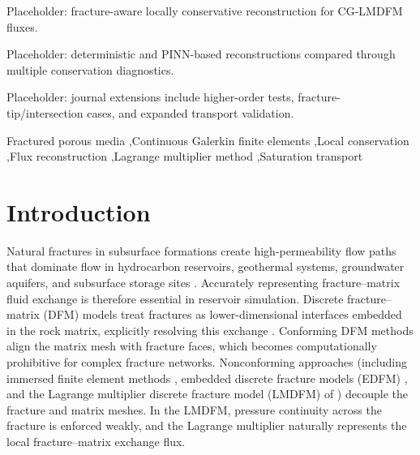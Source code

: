 \documentclass[a4paper,fleqn]{cas-sc}
\begin{document}
\begin{highlights}
\item Placeholder: fracture-aware locally conservative reconstruction for CG-LMDFM fluxes.
\item Placeholder: deterministic and PINN-based reconstructions compared through multiple conservation diagnostics.
\item Placeholder: journal extensions include higher-order tests, fracture-tip/intersection cases, and expanded transport validation.
\end{highlights}

\begin{keywords}
Fractured porous media \sep Continuous Galerkin finite elements \sep Local conservation \sep Flux reconstruction \sep Lagrange multiplier method \sep Saturation transport
\end{keywords}

\maketitle

\section{Introduction}
\label{sec:introduction}

Natural fractures in subsurface formations create high-permeability flow paths that dominate flow in
hydrocarbon reservoirs, geothermal systems, groundwater aquifers, and subsurface storage sites
\citep{Berkowitz2002, Barenblatt1960, WarrenRoot1963, li2008efficient}. Accurately representing fracture--matrix fluid
exchange is therefore essential in reservoir simulation. Discrete fracture--matrix (DFM) models treat
fractures as lower-dimensional interfaces embedded in the rock matrix, explicitly resolving this exchange
\citep{KarimiFard2004}. Conforming DFM methods align the matrix mesh with fracture faces, which becomes
computationally prohibitive for complex fracture networks. Nonconforming approaches (including immersed finite element methods \citep{zhao2024dfm}, embedded
discrete fracture models (EDFM) \citep{Moinfar2014}, and the Lagrange multiplier discrete fracture model
(LMDFM) of \citet{Koeppel2019}) decouple the fracture and matrix meshes. In the LMDFM, pressure continuity across the fracture is enforced weakly, and
the Lagrange multiplier naturally represents the local fracture--matrix exchange flux.
\end{document}
